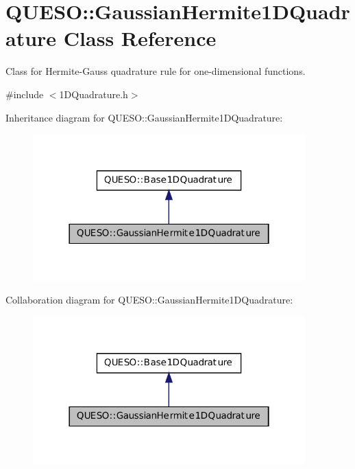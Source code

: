 \hypertarget{class_q_u_e_s_o_1_1_gaussian_hermite1_d_quadrature}{\section{Q\-U\-E\-S\-O\-:\-:Gaussian\-Hermite1\-D\-Quadrature Class Reference}
\label{class_q_u_e_s_o_1_1_gaussian_hermite1_d_quadrature}
}


Class for Hermite-\/\-Gauss quadrature rule for one-\/dimensional functions.  




{\ttfamily \#include $<$1\-D\-Quadrature.\-h$>$}



Inheritance diagram for Q\-U\-E\-S\-O\-:\-:Gaussian\-Hermite1\-D\-Quadrature\-:
\nopagebreak
\begin{figure}[H]
\begin{center}
\leavevmode
\includegraphics[width=298pt]{class_q_u_e_s_o_1_1_gaussian_hermite1_d_quadrature__inherit__graph}
\end{center}
\end{figure}


Collaboration diagram for Q\-U\-E\-S\-O\-:\-:Gaussian\-Hermite1\-D\-Quadrature\-:
\nopagebreak
\begin{figure}[H]
\begin{center}
\leavevmode
\includegraphics[width=298pt]{class_q_u_e_s_o_1_1_gaussian_hermite1_d_quadrature__coll__graph}
\end{center}
\end{figure}
